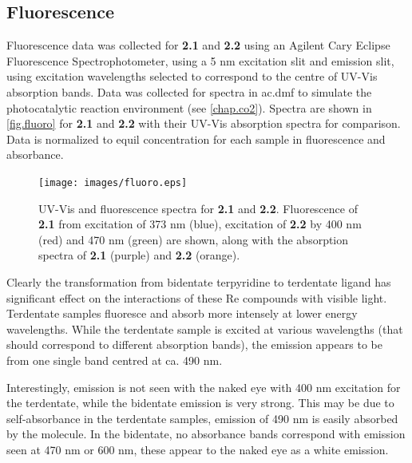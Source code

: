 \FloatBarrier
\subsection{Fluorescence}\label{ss.fluorescence}

Fluorescence data was collected for \textbf{2.1} and \textbf{2.2} using an Agilent Cary Eclipse Fluorescence Spectrophotometer, using a 5 nm excitation slit and emission slit, using excitation wavelengths selected to correspond to the centre of UV-Vis absorption bands. Data was collected for spectra in \gls{ac.dmf} to simulate the photocatalytic reaction environment (see \autoref{chap.co2}). Spectra are shown in \autoref{fig.fluoro} for \textbf{2.1} and \textbf{2.2} with their UV-Vis absorption spectra for comparison. Data is normalized to equil concentration for each sample in fluorescence and absorbance.

\begin{figure}[!htb]
 \centering
  \texttt{[image: images/fluoro.eps]}
 \caption[UV-Vis and fluorescence spectra for \textbf{2.1} and \textbf{2.2}]{UV-Vis and fluorescence spectra for \textbf{2.1} and \textbf{2.2}. Fluorescence of \textbf{2.1} from excitation of 373 nm (blue), excitation of \textbf{2.2} by 400 nm (red) and 470 nm (green) are shown, along with the absorption spectra of \textbf{2.1} (purple) and \textbf{2.2} (orange).}
 \label{fig.fluoro}
\end{figure}

Clearly the transformation from bidentate terpyridine to terdentate ligand has significant effect on the interactions of these Re compounds with visible light. Terdentate samples fluoresce and absorb more intensely at lower energy wavelengths. While the terdentate sample is excited at various wavelengths (that should correspond to different absorption bands), the emission appears to be from one single band centred at ca. 490 nm. 

Interestingly, emission is not seen with the naked eye with 400 nm excitation for the terdentate, while the bidentate emission is very strong. This may be due to self-absorbance in the terdentate samples, emission of 490 nm is easily absorbed by the molecule. In the bidentate, no absorbance bands correspond with emission seen at 470 nm or 600 nm, these appear to the naked eye as a white emission.

